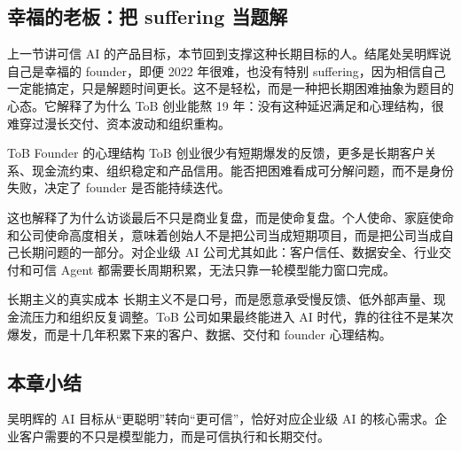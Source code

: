 \subsection{幸福的老板：把 suffering 当题解}

上一节讲可信 AI 的产品目标，本节回到支撑这种长期目标的人。结尾处吴明辉说自己是幸福的 founder，即便 2022 年很难，也没有特别 suffering，因为相信自己一定能搞定，只是解题时间更长。这不是轻松，而是一种把长期困难抽象为题目的心态。它解释了为什么 ToB 创业能熬 19 年：没有这种延迟满足和心理结构，很难穿过漫长交付、资本波动和组织重构。

\begin{knowledgebox}{ToB Founder 的心理结构}
ToB 创业很少有短期爆发的反馈，更多是长期客户关系、现金流约束、组织稳定和产品信用。能否把困难看成可分解问题，而不是身份失败，决定了 founder 是否能持续迭代。
\end{knowledgebox}

这也解释了为什么访谈最后不只是商业复盘，而是使命复盘。个人使命、家庭使命和公司使命高度相关，意味着创始人不是把公司当成短期项目，而是把公司当成自己长期问题的一部分。对企业级 AI 公司尤其如此：客户信任、数据安全、行业交付和可信 Agent 都需要长周期积累，无法只靠一轮模型能力窗口完成。

\begin{importantbox}{长期主义的真实成本}
长期主义不是口号，而是愿意承受慢反馈、低外部声量、现金流压力和组织反复调整。ToB 公司如果最终能进入 AI 时代，靠的往往不是某次爆发，而是十几年积累下来的客户、数据、交付和 founder 心理结构。
\end{importantbox}

\subsection{本章小结}

吴明辉的 AI 目标从“更聪明”转向“更可信”，恰好对应企业级 AI 的核心需求。企业客户需要的不只是模型能力，而是可信执行和长期交付。

